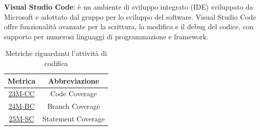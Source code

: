 \textbf{Visual Studio Code}: è un ambiente di sviluppo integrato (IDE) sviluppato da Microsoft e adottato dal gruppo per lo sviluppo del software. Visual Studio Code offre funzionalità avanzate per la scrittura, la modifica e il debug del codice, con supporto per numerosi linguaggi di programmazione e framework.
\begin{table}[!h] %
	\centering
	\begin{tabular}{|c|c|}
		\hline
		\textbf{Metrica}                   & \textbf{Abbreviazione} \\
		\hline
		\hyperlink{subsection.6.2}{23M-CC} & Code Coverage          \\
		\hyperlink{subsection.6.2}{24M-BC} & Branch Coverage        \\
		\hyperlink{subsection.6.2}{25M-SC} & Statement Coverage     \\
		\hline
	\end{tabular}
	\caption{Metriche riguardanti l'attività di codifica}
	\label{tab:2}
\end{table}

\newpage
